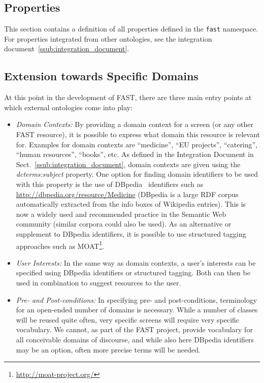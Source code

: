 \documentclass{fast_latex}
\begin{document}
\subsection{Properties} %
\label{sub:properties}

This section contains a definition of all properties defined in the \texttt{fast} namespace. For properties integrated from other ontologies, see the integration document~\ref{ssub:integration_document}.

\singlespacing
\begin{small}

\end{small}
\doublespacing


\subsection{Extension towards Specific Domains} %
\label{sub:extension_towards_specific_domains}

At this point in the development of FAST, there are three main entry points at which external ontologies come into play:

\begin{itemize}
	\item \emph{Domain Contexts:} By providing a domain context for a screen (or any other FAST resource), it is possible to express what domain this resource is relevant for. Examples for domain contexts are ``medicine'', ``EU projects'', ``catering'', ``human resources'', ``books'', etc. As defined in the Integration Document in Sect.~\ref{ssub:integration_document}, domain contexts are given using the \emph{dcterms:subject} property. One option for finding domain identifiers to be used with this property is the use of DBpedia~\cite{Auer07dbpedia} identifiers such as \url{http://dbpedia.org/resource/Medicine} (DBpedia is a large RDF corpus automatically extracted from the info boxes of Wikipedia entries). This is now a widely used and recommended practice in the Semantic Web community (similar corpora could also be used). As an alternative or supplement to DBpedia identifiers, it is possible to use structured tagging approaches such as MOAT\footnote{\url{http://moat-project.org/}}.
	\item \emph{User Interests:} In the same way as domain contexts, a user's interests can be specified using DBpedia identifiers or structured tagging. Both can then be used in combination to suggest resources to the user.
	\item \emph{Pre- and Post-conditions:} In specifying pre- and post-conditions, terminology for an open-ended number of domains is necessary. While a number of classes will be reused quite often, very specific screens will require very specific vocabulary. We cannot, as part of the FAST project, provide vocabulary for all conceivable domains of discourse, and while also here DBpedia identifiers may be an option, often more precise terms will be needed.
\end{itemize}
\end{document}
